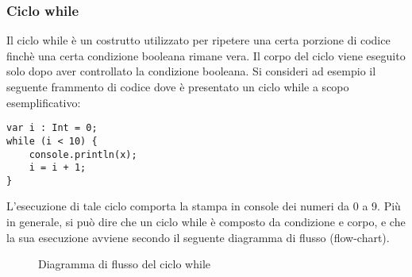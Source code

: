 \subsubsection{Ciclo while}
Il ciclo while è un costrutto utilizzato per ripetere una certa porzione di codice finchè una certa condizione booleana rimane vera. Il corpo del ciclo viene eseguito solo 
dopo aver controllato la condizione booleana. Si consideri ad esempio il seguente frammento di codice dove è presentato un ciclo while a scopo esemplificativo:

\vspace{0.5cm}

\begin{lstlisting}[frame=single]
var i : Int = 0;
while (i < 10) {
    console.println(x);
    i = i + 1;
}
\end{lstlisting}

\vspace{0.5cm}

L’esecuzione di tale ciclo comporta la stampa in console dei numeri da 0 a 9. Più in generale, si può dire che un ciclo while è composto da condizione e 
corpo, e che la sua esecuzione avviene secondo il seguente diagramma di flusso (flow-chart). \\

\vspace{0.5cm}
\begin{figure}[h]
    \centering
    \caption{Diagramma di flusso del ciclo while}
    \label{fig:flowchart_while_loop}
\end{figure}